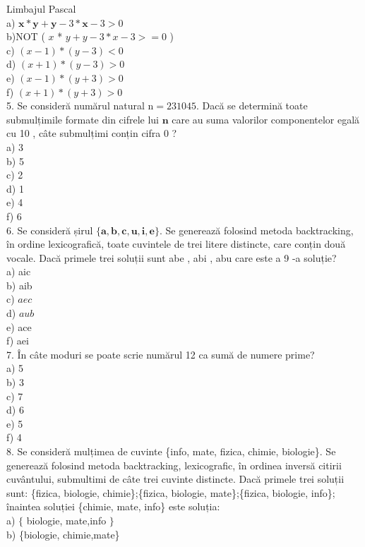 \documentclass[10pt]{article}
\begin{document}
Limbajul Pascal\\
a) $\mathbf{x *} \mathbf{y}+\mathbf{y}-3 * \mathbf{x}-3>0$\\
b)NOT ( $x$ * $y+y-3 * x-3>=0$ )\\
c) $(x-1) *(y-3)<0$\\
d) $(x+1) *(y-3)>0$\\
e) $(x-1) *(y+3)>0$\\
f) $(x+1) *(y+3)>0$\\
5. Se consideră numărul natural $\mathrm{n}=231045$. Dacă se determină toate submulțimile formate din cifrele lui $\mathbf{n}$ care au suma valorilor componentelor egală cu 10 , câte submulțimi conțin cifra 0 ?\\
a) 3\\
b) 5\\
c) 2\\
d) 1\\
e) 4\\
f) 6\\
6. Se consideră șirul $\{\mathbf{a}, \mathbf{b}, \mathbf{c}, \mathbf{u}, \mathbf{i}, \mathbf{e}\}$. Se generează folosind metoda backtracking, în ordine lexicografică, toate cuvintele de trei litere distincte, care conțin două vocale. Dacă primele trei soluții sunt abe , abi , abu care este a 9 -a soluție?\\
a) aic\\
b) aib\\
c) $a e c$\\
d) $a u b$\\
e) ace\\
f) aei\\
7. În câte moduri se poate scrie numărul 12 ca sumă de numere prime?\\
a) 5\\
b) 3\\
c) 7\\
d) 6\\
e) 5\\
f) 4\\
8. Se consideră mulțimea de cuvinte \{info, mate, fizica, chimie, biologie\}. Se generează folosind metoda backtracking, lexicografic, în ordinea inversă citirii cuvântului, submultimi de câte trei cuvinte distincte. Dacă primele trei soluții sunt: \{fizica, biologie, chimie\};\{fizica, biologie, mate\};\{fizica, biologie, info\}; înaintea soluției \{chimie, mate, info\} este soluția:\\
a) $\{$ biologie, mate,info $\}$\\
b) \{biologie, chimie,mate\}\\
\end{document}
